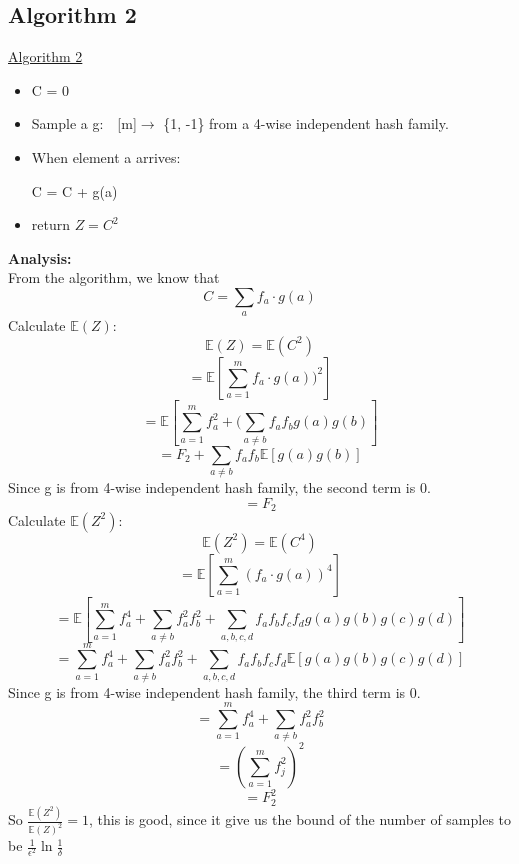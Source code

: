 \documentclass[11pt]{article}
\begin{document}
\subsection{Algorithm 2}
\begin{mdframed}[backgroundcolor=blue!05,topline=false,bottomline=false,leftline=false,rightline=false] 
	\underline{\sc Algorithm 2}
	\begin{itemize}
		\item C = 0
		\item Sample a g:\ \ [m]$\longrightarrow$ \{1, -1\} from a 4-wise independent hash family. 
		\item When element a arrives:\\ 
		      \centerline{C = C + g(a)}
		\item return $Z=C^2$
	\end{itemize}
\end{mdframed}
\textbf{Analysis:}\\
From the algorithm, we know that $$C = \sum_{a} f_a\cdot g(a)$$
Calculate $\mathbb{E}(Z)$:\\
$$\mathbb{E}(Z) = \mathbb{E}(C^2)$$
$$= \mathbb{E}[\sum_{a=1}^m f_a\cdot g(a))^2]$$
$$= \mathbb{E}[\sum_{a=1}^m f_a^2 + (\sum_{a\neq b}f_af_bg(a)g(b)]$$
$$=F_2 + \sum_{a\neq b}f_af_b \mathbb{E}[g(a)g(b)]$$
Since g is from 4-wise independent hash family, the second term is 0.
$$=F_2$$
Calculate $\mathbb{E}(Z^2)$:\\
$$\mathbb{E}(Z^2) = \mathbb{E}(C^4)$$
$$= \mathbb{E}[\sum_{a=1}^m (f_a\cdot g(a))^4]$$
$$= \mathbb{E}[\sum_{a=1}^m f_a^4 + \sum_{a\neq b}f_a^2f_b^2 + \sum_{a,b,c,d}f_af_bf_cf_dg(a)g(b)g(c)g(d)]$$
$$= \sum_{a=1}^m f_a^4 + \sum_{a\neq b}f_a^2f_b^2 + \sum_{a,b,c,d}f_af_bf_cf_d\mathbb{E}[g(a)g(b)g(c)g(d)]$$
Since g is from 4-wise independent hash family, the third term is 0.
$$=\sum_{a=1}^m f_a^4 + \sum_{a\neq b}f_a^2f_b^2$$
$$=(\sum_{a=1}^m f_j^2)^2$$
$$=F_2^2$$
So $\frac{\mathbb{E}(Z^2)}{\mathbb{E}(Z)^2} = 1$, this is good, since it give us the bound of the number of samples to be $\frac{1}{\epsilon^2}\ln{\frac{1}{\delta}} $

\end{document}
